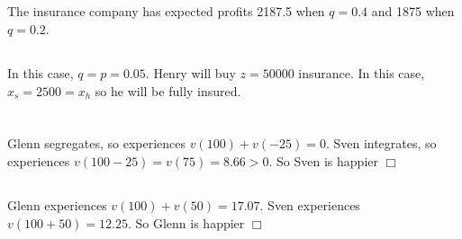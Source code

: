 \documentclass{article}
\begin{document}
\subsection{}
The insurance company has expected profits 2187.5 when $q = 0.4$ and 1875 when $q = 0.2$.

\subsection{}
In this case, $q = p = 0.05$. Henry will buy $z = 50000$ insurance. In this case, $x_s = 2500 = x_h$ so he will be fully insured.

\section{}
\subsection{}
Glenn segregates, so experiences $v(100) + v(-25) = 0$. Sven integrates, so experiences $v(100 - 25) = v(75) = 8.66 > 0$. So Sven is happier $\Box$

\subsection{}
Glenn experiences $v(100) + v(50) = 17.07$. Sven experiences $v(100 + 50) = 12.25$. So Glenn is happier $\Box$
\end{document}
